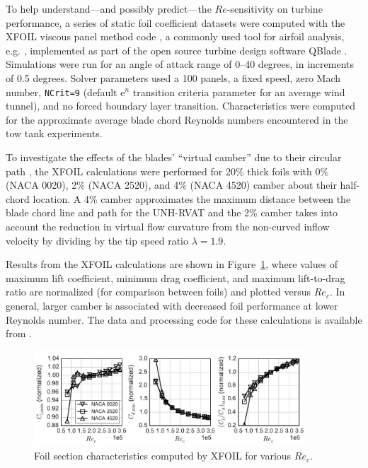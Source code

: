 \documentclass[energies,article,accept,moreauthors,pdftex,12pt,a4paper]{mdpi}
\begin{document}
To help understand---and possibly predict---the $Re$-sensitivity on turbine
performance, a series of static foil coefficient datasets were computed with the
XFOIL viscous panel method code \cite{Drela1989}, a commonly used tool for
airfoil analysis, e.g. \cite{Castelli2011, Walker2014}, implemented as part of
the open source turbine design software QBlade \cite{Marten2013}. Simulations
were run for an angle of attack range of 0--40 degrees, in increments of 0.5
degrees. Solver parameters used a 100 panels, a fixed speed, zero Mach number,
\texttt{NCrit=9} (default $\mathrm{e}^n$ transition criteria parameter for an
average wind tunnel), and no forced boundary layer transition. Characteristics
were computed for the approximate average blade chord Reynolds numbers
encountered in the tow tank experiments.

To investigate the effects of the blades' ``virtual camber'' due to their
circular path \cite{Migliore1980}, the XFOIL calculations were performed for
20\% thick foils with 0\% (NACA 0020), 2\% (NACA 2520), and 4\% (NACA 4520)
camber about their half-chord location. A 4\% camber approximates the maximum
distance between the blade chord line and path for the UNH-RVAT and the 2\%
camber takes into account the reduction in virtual flow curvature from the
non-curved inflow velocity by dividing by the tip speed ratio $\lambda=1.9$.

Results from the XFOIL calculations are shown in Figure~\ref{fig:foil-Re-dep},
where values of maximum lift coefficient, minimum drag coefficient, and maximum
lift-to-drag ratio are normalized (for comparison between foils) and plotted
versus $Re_c$. In general, larger camber is associated with decreased foil
performance at lower Reynolds number. The data and processing code for these
calculations is available from \cite{Bachant2015-NACAXX20-XFOIL}.

\begin{figure}[ht!]
\centering
\includegraphics[width=0.9\textwidth]{figures/all_foils_re_dep}
\caption{Foil section characteristics computed by XFOIL for various $Re_c$.}
\label{fig:foil-Re-dep}
\end{figure}
\end{document}
